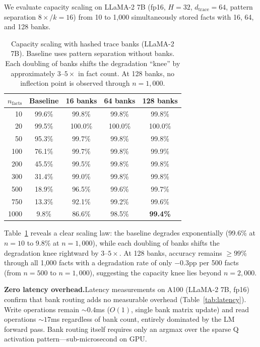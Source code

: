 \documentclass[11pt,a4paper]{article}
\begin{document}
We evaluate capacity scaling on LLaMA-2 7B (fp16, $H{=}32$, $d_{\text{trace}}{=}64$, pattern separation $8\times/k{=}16$) from 10 to 1,000 simultaneously stored facts with 16, 64, and 128 banks.

\begin{table}[t]
  \centering
  \caption{Capacity scaling with hashed trace banks (LLaMA-2 7B). Baseline uses pattern separation without banks. Each doubling of banks shifts the degradation ``knee'' by approximately $3$--$5\times$ in fact count. At 128 banks, no inflection point is observed through $n{=}1{,}000$.}
  \label{tab:bank_scaling}
  \begin{tabular}{@{}rcccc@{}}
    \toprule
    $n_{\text{facts}}$ & Baseline & 16 banks & 64 banks & 128 banks \\
    \midrule
    10   & 99.6\% & 99.8\% & 99.8\% & 99.8\% \\
    20   & 99.5\% & 100.0\% & 100.0\% & 100.0\% \\
    50   & 95.3\% & 99.7\% & 99.8\% & 99.8\% \\
    100  & 76.1\% & 99.7\% & 99.8\% & 99.9\% \\
    200  & 45.5\% & 99.5\% & 99.8\% & 99.8\% \\
    300  & 31.4\% & 99.0\% & 99.8\% & 99.8\% \\
    500  & 18.9\% & 96.5\% & 99.6\% & 99.7\% \\
    750  & 13.3\% & 92.1\% & 99.2\% & 99.6\% \\
    1000 & 9.8\%  & 86.6\% & 98.5\% & \textbf{99.4\%} \\
    \bottomrule
  \end{tabular}
\end{table}

Table~\ref{tab:bank_scaling} reveals a clear scaling law: the baseline degrades exponentially (99.6\% at $n{=}10$ to 9.8\% at $n{=}1{,}000$), while each doubling of banks shifts the degradation knee rightward by $3$--$5\times$. At 128 banks, accuracy remains ${\geq}99\%$ through all 1,000 facts with a degradation rate of only $-0.3$pp per 500 facts (from $n{=}500$ to $n{=}1{,}000$), suggesting the capacity knee lies beyond $n{=}2{,}000$.

\textbf{Zero latency overhead.}\quad Latency measurements on A100 (LLaMA-2 7B, fp16) confirm that bank routing adds no measurable overhead (Table~\ref{tab:latency}). Write operations remain ${\sim}0.4$ms ($O(1)$, single bank matrix update) and read operations ${\sim}17$ms regardless of bank count, entirely dominated by the LM forward pass. Bank routing itself requires only an argmax over the sparse Q activation pattern---sub-microsecond on GPU.
\end{document}
